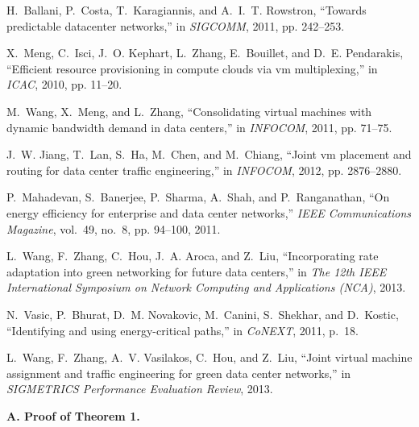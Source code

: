 \documentclass[journal,single-space,two column,twoside,10pt]{IEEEtran}
\begin{document}
\begin{thebibliography}{1}
H.~Ballani, P.~Costa, T.~Karagiannis, and A.~I.~T. Rowstron, ``Towards
  predictable datacenter networks,'' in \emph{SIGCOMM}, 2011, pp. 242--253.

X.~Meng, C.~Isci, J.~O. Kephart, L.~Zhang, E.~Bouillet, and D.~E. Pendarakis,
  ``Efficient resource provisioning in compute clouds via vm multiplexing,'' in
  \emph{ICAC}, 2010, pp. 11--20.

M.~Wang, X.~Meng, and L.~Zhang, ``Consolidating virtual machines with dynamic
  bandwidth demand in data centers,'' in \emph{INFOCOM}, 2011, pp. 71--75.

J.~W. Jiang, T.~Lan, S.~Ha, M.~Chen, and M.~Chiang, ``Joint vm placement and
  routing for data center traffic engineering,'' in \emph{INFOCOM}, 2012, pp.
  2876--2880.

P.~Mahadevan, S.~Banerjee, P.~Sharma, A.~Shah, and P.~Ranganathan, ``On energy
  efficiency for enterprise and data center networks,'' \emph{IEEE
  Communications Magazine}, vol.~49, no.~8, pp. 94--100, 2011.

L.~Wang, F.~Zhang, C.~Hou, J.~A. Aroca, and Z.~Liu, ``Incorporating rate
  adaptation into green networking for future data centers,'' in \emph{The 12th
  IEEE International Symposium on Network Computing and Applications (NCA)},
  2013.

N.~Vasic, P.~Bhurat, D.~M. Novakovic, M.~Canini, S.~Shekhar, and D.~Kostic,
  ``Identifying and using energy-critical paths,'' in \emph{CoNEXT}, 2011,
  p.~18.

L.~Wang, F.~Zhang, A.~V. Vasilakos, C.~Hou, and Z.~Liu, ``Joint virtual machine
  assignment and traffic engineering for green data center networks,'' in
  \emph{SIGMETRICS Performance Evaluation Review}, 2013.
\end{thebibliography}

\newpage

\appendix

\noindent\textbf{A. Proof of Theorem 1.}
\end{document}
